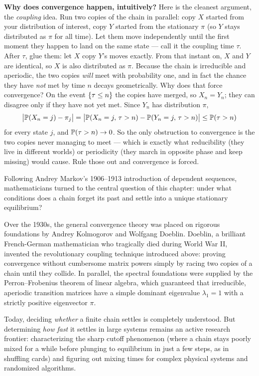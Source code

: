\begin{whybox}
\textbf{Why does convergence happen, intuitively?} Here is the cleanest argument,
the \emph{coupling} idea. Run two copies of the chain in parallel: copy $X$
started from your distribution of interest, copy $Y$ started from the stationary
$\pi$ (so $Y$ stays distributed as $\pi$ for all time). Let them move
independently until the first moment they happen to land on the same state ---
call it the coupling time $\tau$. After $\tau$, glue them: let $X$ copy $Y$'s moves
exactly. From that instant on, $X$ and $Y$ are identical, so $X$ is also
distributed as $\pi$.
Because the chain is irreducible and aperiodic, the two copies \emph{will} meet
with probability one, and in fact the chance they have \emph{not} met by time $n$
decays geometrically. Why does that force convergence? On the event
$\set{\tau \le n}$ the copies have merged, so $X_n = Y_n$; they can disagree only if
they have not yet met. Since $Y_n$ has distribution $\pi$,
\[
  \abs[\big]{\P(X_n = j) - \pi_j}
  = \abs[\big]{\P(X_n = j,\, \tau > n) - \P(Y_n = j,\, \tau > n)}
  \le \P(\tau > n)
\]
for every state $j$, and $\P(\tau > n) \to 0$. So the only obstruction to
convergence is the two copies never managing to meet --- which is exactly what
reducibility (they live in different worlds) or periodicity (they march in
opposite phase and keep missing) would cause. Rule those out and convergence is
forced.
\end{whybox}
\begin{historybox}
Following Andrey Markov's 1906--1913 introduction of dependent sequences,
mathematicians turned to the central question of this chapter: under what
conditions does a chain forget its past and settle into a unique stationary
equilibrium?

Over the 1930s, the general convergence theory was placed on rigorous foundations
by Andrey Kolmogorov and Wolfgang Doeblin. Doeblin, a brilliant French-German
mathematician who tragically died during World War II, invented the revolutionary
coupling technique introduced above: proving convergence without cumbersome matrix
powers simply by racing two copies of a chain until they collide. In parallel, the
spectral foundations were supplied by the Perron--Frobenius theorem of linear
algebra, which guaranteed that irreducible, aperiodic transition matrices have a
simple dominant eigenvalue $\lambda_1 = 1$ with a strictly positive eigenvector $\pi$.

Today, deciding \emph{whether} a finite chain settles is completely understood.
But determining \emph{how fast} it settles in large systems remains an
active research frontier: characterizing the sharp cutoff phenomenon (where a chain
stays poorly mixed for a while before plunging to equilibrium in just a few steps, as in shuffling cards) and figuring out mixing times for complex physical systems and randomized algorithms.
\end{historybox}
